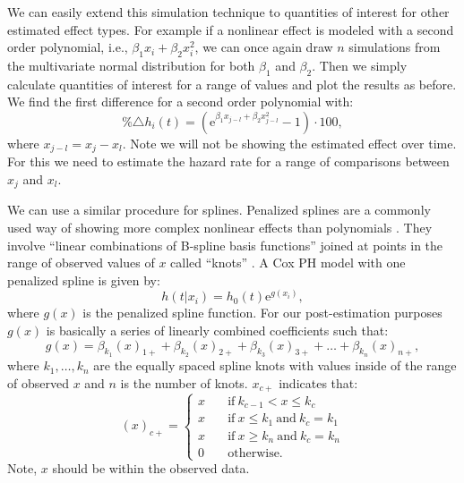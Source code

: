 \documentclass[nojss]{jss}\usepackage[]{graphicx}\usepackage[]{color}
\begin{document}
We can easily extend this simulation technique to quantities of interest for other estimated effect types. For example if a nonlinear effect is modeled with a second order polynomial, i.e., $\beta_{1}x_{i} + \beta_{2}x_{i}^{2}$, we can once again draw $n$ simulations from the multivariate normal distribution for both $\beta_{1}$ and $\beta_{2}$. Then we simply calculate quantities of interest for a range of values and plot the results as before. We find the first difference for a second order polynomial with:
%
\begin{equation}
    \%\triangle h_{i}(t) = (\mathrm{e}^{\beta_{1}x_{j-l} + \beta_{2}x_{j-l}^{2}} - 1) \cdot 100,
\end{equation}
%
where $x_{j-l} = x_{j} - x_{l}$. Note we will not be showing the estimated effect over time. For this we need to estimate the hazard rate for a range of comparisons between $x_{j}$ and $x_{l}$.

We can use a similar procedure for splines. Penalized splines \citep{Eilers1996} are a commonly used way of showing more complex nonlinear effects than polynomials \cite[see][]{Keele2008}. They involve ``linear combinations of B-spline basis functions'' \citep[p. 5]{Strasak2009} joined at points in the range of observed values of $x$ called ``knots'' \citep[p. 50]{Keele2008}. A Cox PH model with one penalized spline is given by:
%
\begin{equation}
    h(t|x_{i})=h_{0}(t)\mathrm{e}^{g(x_{i})},
\end{equation}
%
where $g(x)$ is the penalized spline function. For our post-estimation purposes $g(x)$ is basically a series of linearly combined coefficients such that:
%
\begin{equation}
    g(x) = \beta_{k_{1}}(x)_{1+} + \beta_{k_{2}}(x)_{2+} + \beta_{k_{3}}(x)_{3+} + \ldots + \beta_{k_{n}}(x)_{n+},
\end{equation}
%
where $k_1, \dots, k_n$ are the equally spaced spline knots with values inside of the range of observed $x$ and $n$ is the number of knots. $x_{c+}$ indicates that:
%
\begin{equation}
    (x)_{c+} =
    \left \{
    \begin{array}{ll}
        x & \quad \text{if} \: k_{c-1} < x \leq k_{c} \\
        x & \quad \text{if} \: x \leq k_{1} \: \text{and} \: k_{c} = k_{1} \\
        x & \quad \text{if} \: x \geq k_{n} \: \text{and} \: k_{c} = k_{n} \\
        0 & \quad \text{otherwise.}
    \end{array}
    \right.
\end{equation}
%
Note, $x$ should be within the observed data.
\end{document}
